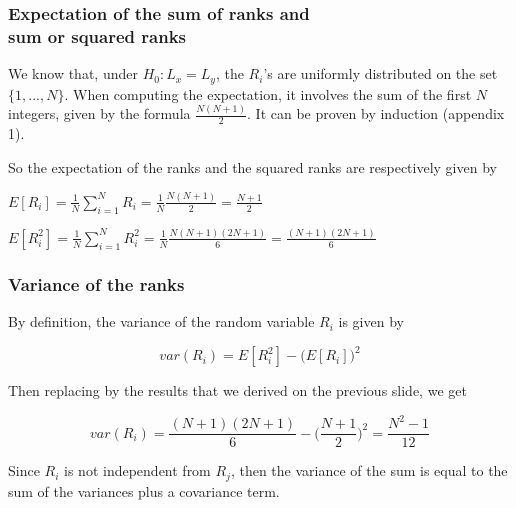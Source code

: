 \documentclass[border=5mm, convert, usenames, dvipsnames,beamer]{standalone}
\begin{document}
\begin{frame}
\frametitle{Expectation of the sum of ranks and \\ sum or squared ranks}

\vspace{40}
\noindent
We know that, under  $H_{0}:  L_{x} = L_{y}$, the $R_{i}$'s are uniformly distributed on the set $\{1,...,N\}$. When computing the expectation, it involves the sum of the first $N$ integers, given by the formula $\frac{N (N+1)}{2}$. It can be proven by induction (appendix 1).

\vspace{15}
\noindent
So the expectation of the ranks and the squared ranks are respectively given by

\vspace{15}
\noindent
$E[R_{i}] = \frac{1}{N} \sum_{i=1}^{N} R_{i} = \frac{1}{N} \frac{N (N+1)}{2}=\frac{N+1}{2} $


\vspace{15}
\noindent
$E[R_{i}^2] =  \frac{1}{N} \sum_{i=1}^{N} R_{i}^{2} = \frac{1}{N} \frac{N (N+1)(2N+1)}{6} =\frac{(N+1)(2N+1)}{6} $

\par
\end{frame}








\begin{frame}[ fragile]{}

\frametitle{Variance of the ranks}

\vspace{40}
\noindent
By definition, the variance of the random variable $R_{i}$ is given by

$$var(R_{i}) = E[R_{i}^2] -\big( E[R_{i}] \big)^2$$

\vspace{5}
\noindent
Then replacing by the results that we derived on the previous slide, we get

$$var(R_{i})= \frac{(N+1)(2N+1)}{6} - \bigg( \frac{N+1}{2}   \bigg)^{2} =  \frac{N^2 -1}{12}$$


\vspace{5}
\noindent
Since $R_{i}$ is not independent from $R_{j}$, then the variance of the sum is equal to the sum of the variances plus a covariance term.

\end{frame}
\end{document}
